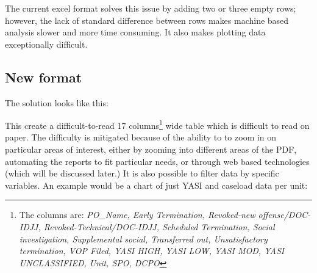 \documentclass[12pt,]{article}
\let\rmarkdownfootnote\footnote%
\def\footnote{\protect\rmarkdownfootnote}
\begin{document}
The current excel format solves this issue by adding two or three empty
rows; however, the lack of standard difference between rows makes
machine based analysis slower and more time consuming. It also makes
plotting data exceptionally difficult.

\newpage

\begin{landscape}

\hypertarget{new-format}{%
\subsection{New format}\label{new-format}}

The solution looks like this:

\begin{table}[!h]

\caption{\label{tab:tidy}GBO: September, 2018}
\centering
{}
\end{table}

This create a difficult-to-read 17 columns\footnote{The columns are:
  \emph{PO\_Name, Early Termination, Revoked-new offense/DOC-IDJJ,
  Revoked-Technical/DOC-IDJJ, Scheduled Termination, Social
  investigation, Supplemental social, Transferred out, Unsatisfactory
  termination, VOP Filed, YASI HIGH, YASI LOW, YASI MOD, YASI
  UNCLASSIFIED, Unit, SPO, DCPO}} wide table which is difficult to read
on paper. The difficulty is mitigated because of the ability to to zoom
in on particular areas of interest, either by zooming into different
areas of the PDF, automating the reports to fit particular needs, or
through web based technologies (which will be discussed later.) It is
also possible to filter data by specific variables. An example would be
a chart of just YASI and caseload data per unit:


\end{landscape}
\end{document}
